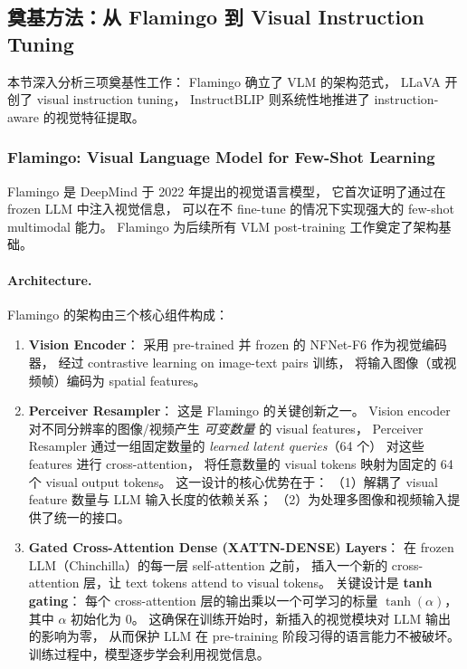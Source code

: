 \subsection{奠基方法：从 Flamingo 到 Visual Instruction Tuning}
\label{sec:t5-foundation}

本节深入分析三项奠基性工作：
Flamingo \cite{alayrac2022flamingo} 确立了 VLM 的架构范式，
LLaVA \cite{liu2023llava} 开创了 visual instruction tuning，
InstructBLIP \cite{dai2023instructblip} 则系统性地推进了 instruction-aware 的视觉特征提取。

\subsubsection{Flamingo: Visual Language Model for Few-Shot Learning}
\label{sec:t5-flamingo}

Flamingo \cite{alayrac2022flamingo} 是 DeepMind 于 2022 年提出的视觉语言模型，
它首次证明了通过在 frozen LLM 中注入视觉信息，
可以在不 fine-tune 的情况下实现强大的 few-shot multimodal 能力。
Flamingo 为后续所有 VLM post-training 工作奠定了架构基础。

\paragraph{Architecture.}
Flamingo 的架构由三个核心组件构成：

\begin{enumerate}[leftmargin=2em]
  \item \textbf{Vision Encoder}：
    采用 pre-trained 并 frozen 的 NFNet-F6 作为视觉编码器，
    经过 contrastive learning on image-text pairs 训练，
    将输入图像（或视频帧）编码为 spatial features。

  \item \textbf{Perceiver Resampler}：
    这是 Flamingo 的关键创新之一。
    Vision encoder 对不同分辨率的图像/视频产生 \textit{可变数量} 的 visual features，
    Perceiver Resampler 通过一组固定数量的 \textit{learned latent queries}（64 个）
    对这些 features 进行 cross-attention，
    将任意数量的 visual tokens 映射为固定的 64 个 visual output tokens。
    这一设计的核心优势在于：
    （1）解耦了 visual feature 数量与 LLM 输入长度的依赖关系；
    （2）为处理多图像和视频输入提供了统一的接口。

  \item \textbf{Gated Cross-Attention Dense (XATTN-DENSE) Layers}：
    在 frozen LLM（Chinchilla）的每一层 self-attention 之前，
    插入一个新的 cross-attention 层，让 text tokens attend to visual tokens。
    关键设计是 \textbf{tanh gating}：
    每个 cross-attention 层的输出乘以一个可学习的标量 $\tanh(\alpha)$，
    其中 $\alpha$ 初始化为 0。
    这确保在训练开始时，新插入的视觉模块对 LLM 输出的影响为零，
    从而保护 LLM 在 pre-training 阶段习得的语言能力不被破坏。
    训练过程中，模型逐步学会利用视觉信息。
\end{enumerate}

